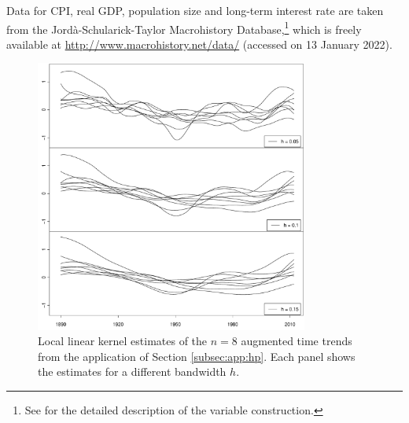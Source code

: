 \documentclass[a4paper,12pt]{article}
\begin{document}

Data for CPI, real GDP, population size and long-term interest rate are taken from the Jordà-Schularick-Taylor Macrohistory Database,\footnote{See \cite{Jorda2017} for the detailed description of the variable construction.} which is freely available at \linebreak\url{http://www.macrohistory.net/data/} (accessed on 13 January 2022).

\begin{figure}[t!]
\centering
\includegraphics[width=0.8\textwidth]{output/plots/hp/smoothed_hp_data_augmented.pdf}
\vspace{0.2cm}
\caption{Local linear kernel estimates of the $n=8$ augmented time trends from the application of Section \ref{subsec:app:hp}. Each panel shows the estimates for a different bandwidth $h$.}\label{fig:app:hp_augm}
\end{figure}
\end{document}
